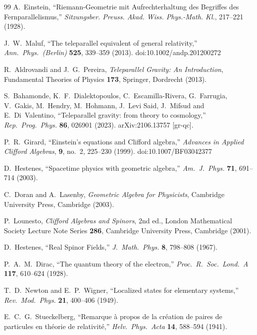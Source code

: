 \documentclass[a4paper]{article}
\begin{document}
\begin{thebibliography}{99}
A.~Einstein,
``Riemann-Geometrie mit Aufrechterhaltung des Begriffes des Fernparallelismus,''
\textit{Sitzungsber. Preuss. Akad. Wiss. Phys.-Math. Kl.},
217--221 (1928).

J.~W.~Maluf,
``The teleparallel equivalent of general relativity,''
\textit{Ann.\ Phys.\ (Berlin)} \textbf{525}, 339--359 (2013).
doi:10.1002/andp.201200272

R.~Aldrovandi and J.~G.~Pereira,
\textit{Teleparallel Gravity: An Introduction},
Fundamental Theories of Physics \textbf{173},
Springer, Dordrecht (2013).

S.~Bahamonde, K.~F.~Dialektopoulos, C.~Escamilla-Rivera, G.~Farrugia, V.~Gakis, M.~Hendry, M.~Hohmann, J.~Levi Said, J.~Mifsud and E.~Di~Valentino,
``Teleparallel gravity: from theory to cosmology,''
\textit{Rep.\ Prog.\ Phys.} \textbf{86}, 026901 (2023).
arXiv:2106.13757 [gr-qc].

P.~R.~Girard,
``Einstein's equations and Clifford algebra,''
\textit{Advances in Applied Clifford Algebras},
\textbf{9}, no.~2, 225--230 (1999).
doi:10.1007/BF03042377

D.~Hestenes,
``Spacetime physics with geometric algebra,''
\textit{Am.\ J.\ Phys.} \textbf{71}, 691--714 (2003).

C.~Doran and A.~Lasenby,
\textit{Geometric Algebra for Physicists},
Cambridge University Press, Cambridge (2003).

P.~Lounesto,
\textit{Clifford Algebras and Spinors}, 2nd ed.,
London Mathematical Society Lecture Note Series \textbf{286},
Cambridge University Press, Cambridge (2001).

D.~Hestenes,
``Real Spinor Fields,''
\textit{J.\ Math.\ Phys.} \textbf{8}, 798--808 (1967).

P.~A.~M.~Dirac,
``The quantum theory of the electron,''
\textit{Proc.\ R.\ Soc.\ Lond.\ A} \textbf{117}, 610--624 (1928).

T.~D.~Newton and E.~P.~Wigner,
``Localized states for elementary systems,''
\textit{Rev.\ Mod.\ Phys.} \textbf{21}, 400--406 (1949).

E.~C.~G.~Stueckelberg,
``Remarque \`a propos de la cr\'eation de paires de particules en th\'eorie de relativit\'e,''
\textit{Helv.\ Phys.\ Acta} \textbf{14}, 588--594 (1941).


\end{thebibliography}
\end{document}
